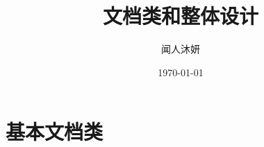 \documentclass{ctexart}
\title{文档类和整体设计}
\author{闻人沐妍}
\date{\today}
\begin{document}
    \maketitle
    \tableofcontents

    \section{基本文档类}
        
\end{document}
